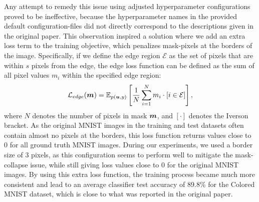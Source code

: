 Any attempt to remedy this issue using adjusted hyperparameter configurations proved to be ineffective, because the hyperparameter names in the provided default configuration-files did not directly correspond to the descriptions given in the original paper.
This observation inspired a solution where we add an extra loss term to the training objective, which penalizes mask-pixels at the borders of the image. Specifically, if we define the edge region $\mathcal{E}$ as the set of pixels that are within $s$ pixels from the edge, the edge loss function can be defined as the sum of all pixel values $m_i$ within the specified edge region:
\begin{equation} \label{eq:center-loss}
    \mathcal{L}_{edge}(\boldsymbol{m}) = \mathbb{E}_{p(\boldsymbol{u}, y)} \left[\frac{1}{N} \sum_{i=1}^N m_i \cdot  [i \in \mathcal{E}]\right],
\end{equation}
where $N$ denotes the number of pixels in mask $\boldsymbol{m}$, and $[\cdot]$ denotes the Iverson bracket. As the original MNIST images in the training and test datasets often contain almost no pixels at the borders, this loss function returns values close to 0 for all ground truth MNIST images. During our experiments, we used a border size of 3 pixels, as this configuration seems to perform well to mitigate the mask-collapse issue, while still giving loss values close to 0 for the original MNIST images. By using this extra loss function, the training process became much more consistent and lead to an average classifier test accuracy of 89.8\% for the Colored MNIST dataset, which is close to what was reported in the original paper.


